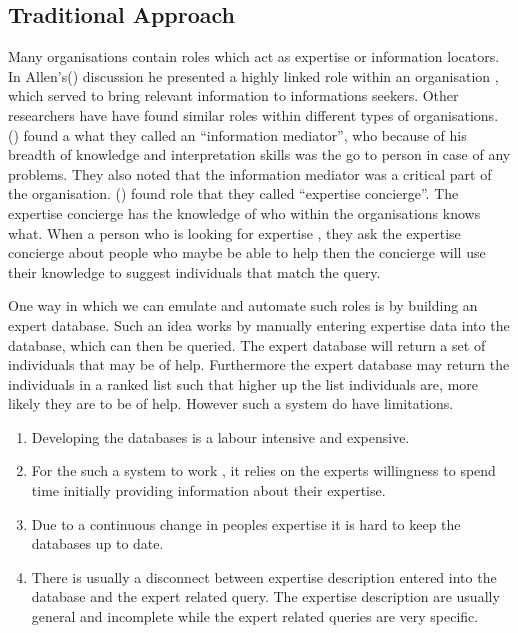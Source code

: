 \documentclass[a4paper,oneside,11pt]{report}
\begin{document}
\subsection{Traditional Approach}
Many organisations contain roles which act as expertise or information locators.
In Allen's(\citeyear{allen1977}) discussion he presented a highly linked role within an organisation , which served to bring relevant information to informations seekers. Other researchers have have found similar roles within different types of organisations. \citeauthor{ehrlichcash1994}(\citeyear{ehrlichcash1994}) found a what they called an \enquote{information mediator}, who because of his breadth of knowledge and interpretation skills was the go to person in case of any problems. They also noted that the information mediator was a critical part of the organisation. \citeauthor{mcdonalackerman1998}(\citeyear{mcdonalackerman1998}) found role that they called \enquote{expertise concierge}. The expertise concierge has the knowledge of who within the organisations knows what. When a person who is looking for expertise , they ask the expertise concierge about people who maybe be able to help then the concierge will use their knowledge to suggest individuals that match the query.

One way in which we can emulate and automate such roles is by building an expert database. Such an idea works by manually entering expertise data into the database, which can then be queried. The expert database will return a set of individuals that may be of help. Furthermore the expert database  may return the individuals in a ranked list such that higher up the list individuals are, more likely they are to be of help. However such a system do have limitations\autocite{kobsaseid2003}.
\begin{enumerate}
	\item Developing the databases is a labour intensive and expensive.
	\item For the such a system to work , it relies on the experts willingness to spend time 		  			  initially providing information about their expertise.
	\item Due to a continuous change in peoples expertise it is hard to keep the databases up to 				  date.
	\item There is usually a disconnect between expertise description entered into the database and 	          the expert related query. The expertise description are usually general and incomplete                                                                            		  while the expert related queries are very specific. 
\end{enumerate}
\end{document}
